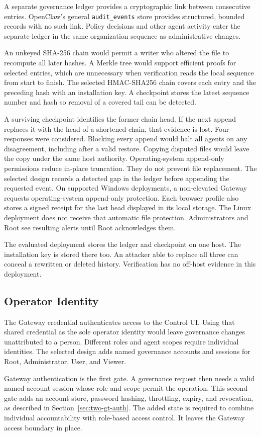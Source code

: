 {\color{red}A separate governance ledger provides a cryptographic link between
consecutive entries. OpenClaw's general \texttt{audit\_events} store provides
structured, bounded records with no such link. Policy decisions and other
agent activity enter the separate ledger in the same organization sequence
as administrative changes.

An unkeyed SHA-256 chain would permit a writer who altered the file to recompute
all later hashes. A Merkle tree would support efficient proofs for selected
entries, which are unnecessary when verification reads the local sequence from
start to finish. The selected HMAC-SHA256 chain covers each entry and the
preceding hash with an installation key. A checkpoint stores the latest
sequence number and hash so removal of a covered tail can be detected.

A surviving checkpoint identifies the former chain head. If the next append
replaces it with the head of a shortened chain, that evidence is lost. Four
responses were considered. Blocking every append would halt all agents on any
disagreement, including after a valid restore. Copying disputed files would
leave the copy under the same host authority. Operating-system append-only
permissions reduce in-place truncation. They do not prevent file replacement.
The selected design records a detected gap in the ledger before appending the
requested event. On supported Windows deployments, a non-elevated Gateway
requests operating-system append-only protection. Each browser profile also
stores a signed receipt for the last head displayed in its local storage. The
Linux deployment does not receive that automatic file protection.
Administrators and Root see resulting alerts until Root acknowledges them.

The evaluated deployment stores the ledger and checkpoint on one host.
The installation key is stored there too. An attacker
able to replace all three can conceal a rewritten or deleted history.
Verification has no off-host evidence in this deployment.}
\subsection{Operator Identity}
\label{sec:gov-operator-identity}

{\color{red}The Gateway credential authenticates access to the Control UI. Using
that shared credential as the sole operator identity would leave governance
changes unattributed to a person. Different roles and agent scopes require
individual identities. The selected design adds named governance
accounts and sessions for Root, Administrator, User, and Viewer.

Gateway authentication is the first gate. A governance request then needs
a valid named-account session whose role and scope permit the operation. This
second gate adds an account store, password hashing, throttling, expiry, and
revocation, as described in Section~\ref{sec:two-gt-auth}. The added state is
required to combine individual accountability with role-based access control.
It leaves the Gateway access boundary in place.}

